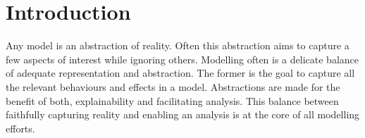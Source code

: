\chapter{Introduction}


Any model is an abstraction of reality.
Often this abstraction aims to capture a few aspects of interest while ignoring others.
Modelling often is a delicate balance of adequate representation and abstraction.
The former is the goal to capture all the relevant behaviours and effects in a model.
Abstractions are made for the benefit of both, explainability and facilitating analysis.
This balance between faithfully capturing reality and enabling an analysis is at the core of all modelling efforts.



